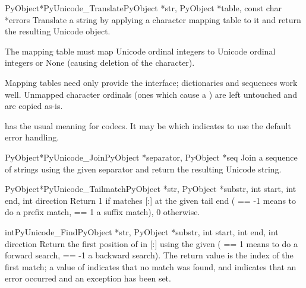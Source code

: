 \begin{cfuncdesc}{PyObject*}{PyUnicode_Translate}{PyObject *str,
                                                  PyObject *table,
                                                  const char *errors}
  Translate a string by applying a character mapping table to it and
  return the resulting Unicode object.

  The mapping table must map Unicode ordinal integers to Unicode
  ordinal integers or None (causing deletion of the character).

  Mapping tables need only provide the 
  interface; dictionaries and sequences work well.  Unmapped character
  ordinals (ones which cause a ) are left
  untouched and are copied as-is.

   has the usual meaning for codecs. It may be \NULL{}
  which indicates to use the default error handling.
\end{cfuncdesc}

\begin{cfuncdesc}{PyObject*}{PyUnicode_Join}{PyObject *separator,
                                             PyObject *seq}
  Join a sequence of strings using the given separator and return the
  resulting Unicode string.
\end{cfuncdesc}

\begin{cfuncdesc}{PyObject*}{PyUnicode_Tailmatch}{PyObject *str,
                                                  PyObject *substr,
                                                  int start,
                                                  int end,
                                                  int direction}
  Return 1 if  matches [:] at
  the given tail end ( == -1 means to do a prefix
  match,  == 1 a suffix match), 0 otherwise.
\end{cfuncdesc}

\begin{cfuncdesc}{int}{PyUnicode_Find}{PyObject *str,
                                       PyObject *substr,
                                       int start,
                                       int end,
                                       int direction}
  Return the first position of  in
  [:] using the given 
  ( == 1 means to do a forward search,
   == -1 a backward search).  The return value is the
  index of the first match; a value of  indicates that no
  match was found, and  indicates that an error occurred and
  an exception has been set.
\end{cfuncdesc}

